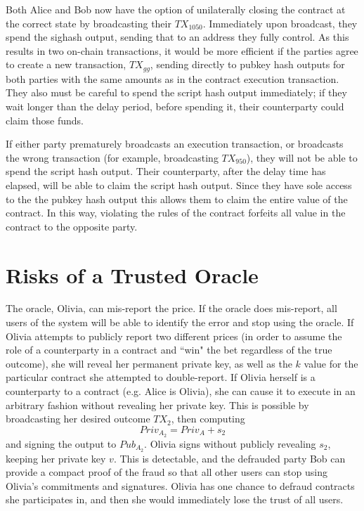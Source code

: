 \documentclass[10pt]{article}
\begin{document}
Both Alice and Bob now have the option of unilaterally closing the contract at the correct state by broadcasting their \(TX_{1050}\).  Immediately upon broadcast, they spend the sighash output, sending that to an address they fully control.  As this results in two on-chain transactions, it would be more efficient if the parties agree to create a new transaction, \(TX_{gg}\), sending directly to pubkey hash outputs for both parties with the same amounts as in the contract execution transaction.  They also must be careful to spend the script hash output immediately; if they wait longer than the delay period, before spending it, their counterparty could claim those funds.

If either party prematurely broadcasts an execution transaction, or broadcasts the wrong transaction (for example, broadcasting \(TX_{950}\)), they will not be able to spend the script hash output.  Their counterparty, after the delay time has elapsed, will be able to claim the script hash output.  Since they have sole access to the the pubkey hash output this allows them to claim the entire value of the contract.  In this way, violating the rules of the contract forfeits all value in the contract to the opposite party.

\section*{Risks of a Trusted Oracle}

The oracle, Olivia, can mis-report the price.  If the oracle does mis-report, all users of the system will be able to identify the error and stop using the oracle.  If Olivia attempts to publicly report two different prices (in order to assume the role of a counterparty in a contract and ``win" the bet regardless of the true outcome), she will reveal her permanent private key, as well as the \(k\) value for the particular contract she attempted to double-report.
If Olivia herself is a counterparty to a contract (e.g. Alice is Olivia), she can cause it to execute in an arbitrary fashion without revealing her private key.  This is possible by broadcasting her desired outcome \(TX_{2}\), then computing 
\[Priv_{A_2} =  Priv_{A} + s_{2}\]
and signing the output to \(Pub_{A_2}\).  Olivia signs without publicly revealing \(s_2\), keeping her private key \(v\).  This is detectable, and the defrauded party Bob can provide a compact proof of the fraud so that all other users can stop using Olivia's commitments and signatures.  Olivia has one chance to defraud contracts she participates in, and then she would immediately lose the trust of all users.
\end{document}
